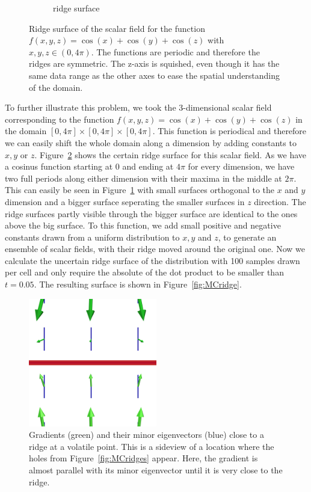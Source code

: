 \begin{figure}[t]
\begin{subfigure}[b]{0.49\textwidth}
        \caption{ridge surface}
        \label{fig:certainRidge}
    \end{subfigure}
    \caption{Ridge surface of the scalar field for the function
    $f(x,y,z)=\cos(x)+\cos(y) +\cos(z)$ with $x,y,z \in (0, 4\pi)$. The
    functions are periodic and therefore the ridges are symmetric. The
    z-axis is squished, even though it has the same data range as the
    other axes to ease the spatial understanding of the domain.}
    \label{fig:ridge}
\end{figure}
\indent To further illustrate this problem, we took the 3-dimensional
scalar field corresponding to the function $f(x,y,z) = \cos{(x)} +
\cos{(y)} + \cos{(z)}$ in the domain $[0, 4 \pi] \times [0, 4\pi] \times
[0, 4\pi]$. This function is periodical and therefore we can easily
shift the whole domain along a dimension by adding constants to $x, y$
or $z$. Figure~\ref{fig:ridge} shows the certain ridge surface for this
scalar field. As we have a cosinus function starting at 0 and ending at
$4\pi$ for every dimension, we have two full periods along either
dimension with their maxima in the middle at $2\pi$. This can easily be
seen in Figure~\ref{fig:certainRidge} with small surfaces orthogonal to
the $x$ and $y$ dimension and a bigger surface seperating the smaller
surfaces in $z$ direction. The ridge surfaces partly visible through the
bigger surface are identical to the ones above the big surface. To this
function, we add small positive and negative constants drawn from a
uniform distribution to $x, y$ and $z$, to generate an ensemble of
scalar fields, with their ridge moved around the original one. Now we
calculate the uncertain ridge surface of the distribution with 100
samples drawn per cell and only require the absolute of the dot product
to be smaller than $t=0.05$. The resulting surface is shown in
Figure~\ref{fig:MCridge}.
\begin{figure}
    \centering
    \includegraphics[trim= 0 300 0 300, clip=true, width=0.5\textwidth]{Images/weakridge.png}
    \caption{Gradients (green) and their minor eigenvectors (blue) close to
    a ridge at a volatile point. This is a sideview of a location where the
    holes from Figure~\ref{fig:MCridges} appear. Here, the gradient is almost
    parallel with its minor eigenvector until it is very close to the ridge.}
    \label{fig:volatile}
\end{figure}
